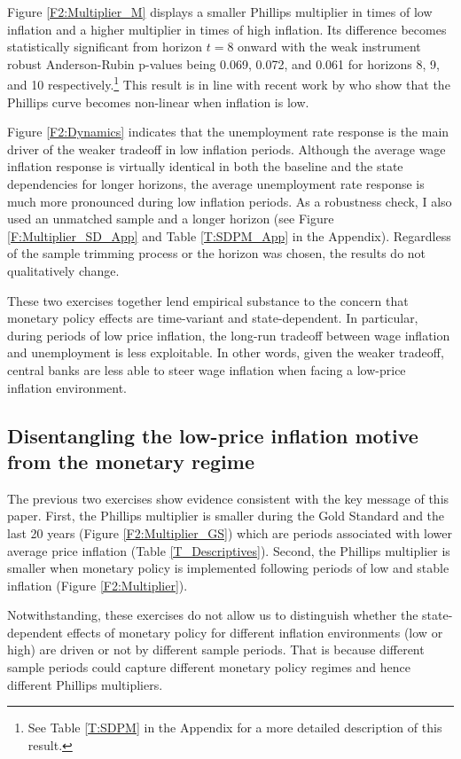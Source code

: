 \documentclass[12pt]{article}
\begin{document}
Figure \ref{F2:Multiplier_M} displays a smaller Phillips multiplier in times of low inflation and a higher multiplier in times of high inflation. Its difference becomes statistically significant from horizon $t=8$ onward with the weak instrument robust Anderson-Rubin p-values being 0.069, 0.072, and 0.061 for horizons 8, 9, and 10 respectively.\footnote{See Table \ref{T:SDPM} in the Appendix for a more detailed description of this result.} This result is in line with recent work by \cite{Forbes2021} who show that the Phillips curve becomes non-linear when inflation is low.

Figure \ref{F2:Dynamics} indicates that the unemployment rate response is the main driver of the weaker tradeoff in low inflation periods. Although the average wage inflation response is virtually identical in both the baseline and the state dependencies for longer horizons, the average unemployment rate response is much more pronounced during low inflation periods. As a robustness check, I also used an unmatched sample and a longer horizon (see Figure \ref{F:Multiplier_SD_App} and Table \ref{T:SDPM_App} in the Appendix). Regardless of the sample trimming process or the horizon was chosen, the results do not qualitatively change.

These two exercises together lend empirical substance to the concern that monetary policy effects are time-variant and state-dependent. In particular, during periods of low price inflation, the long-run tradeoff between wage inflation and unemployment is less exploitable. In other words, given the weaker tradeoff, central banks are less able to steer wage inflation when facing a low-price inflation environment.

\subsection{Disentangling the low-price inflation motive from the monetary regime}

The previous two exercises show evidence consistent with the key message of this paper. First, the Phillips multiplier is smaller during the Gold Standard and the last 20 years (Figure \ref{F2:Multiplier_GS}) which are periods associated with lower average price inflation (Table \ref{T_Descriptives}). Second, the Phillips multiplier is smaller when monetary policy is implemented following periods of low and stable inflation (Figure \ref{F2:Multiplier}).

Notwithstanding, these exercises do not allow us to distinguish whether the state-dependent effects of monetary policy for different inflation environments (low or high) are driven or not by different sample periods. That is because different sample periods could capture different monetary policy regimes and hence different Phillips multipliers.
\end{document}
